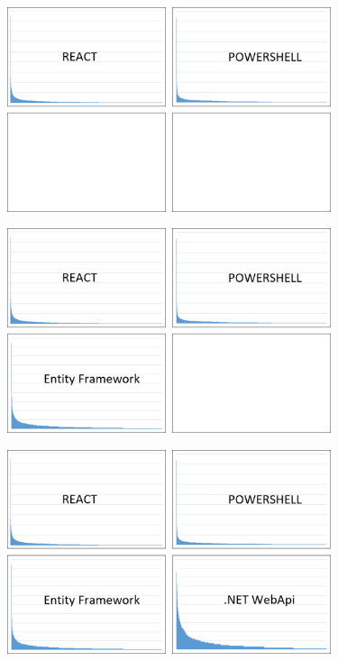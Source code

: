 \documentclass{beamer}
\begin{document}
\begin{frame}{}
\begin{center}
  	\includegraphics[height=6cm]{git_log3.png}
\end{center}
\end{frame}

\begin{frame}{}
\begin{center}
  	\includegraphics[height=6cm]{git_log4.png}
\end{center}
\end{frame}

\begin{frame}{}
\begin{center}
  	\includegraphics[height=6cm]{git_log5.png}
\end{center}
\end{frame}
\end{document}
